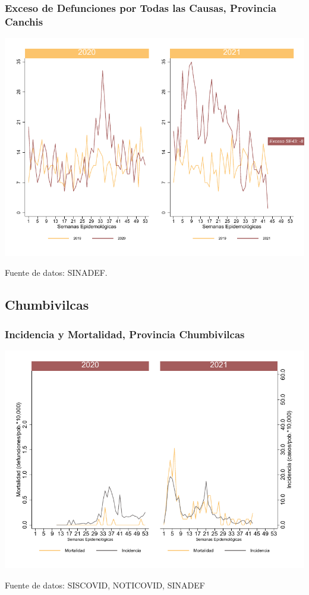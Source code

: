 \documentclass[xcolor=table]{beamer}
\begin{document}
\begin{frame}
	\frametitle{Exceso de Defunciones por Todas las Causas, Provincia Canchis}
	\vspace{-.5cm}
	\begin{center}
		\includegraphics[width=0.8\linewidth, trim={0cm .5cm 0cm 0.2cm},clip]{../figuras/exceso_5.pdf}
	\end{center}
	{\tiny Fuente de datos: SINADEF.}
	
	\hyperlink{indicadores_provinciales}{}
\end{frame}

\subsection{Chumbivilcas}

\begin{frame}[label=Chumbivilcas]
	\frametitle{Incidencia y Mortalidad, Provincia Chumbivilcas}
	\vspace{-.5cm}
	\begin{center}
		\includegraphics[width=0.8\linewidth, trim={0cm .5cm 0cm 0.2cm},clip]{../figuras/incidencia_mortalidad_20_21_6.pdf}
	\end{center}
	{\tiny Fuente de datos: SISCOVID, NOTICOVID, SINADEF}
\end{frame}
\end{document}
